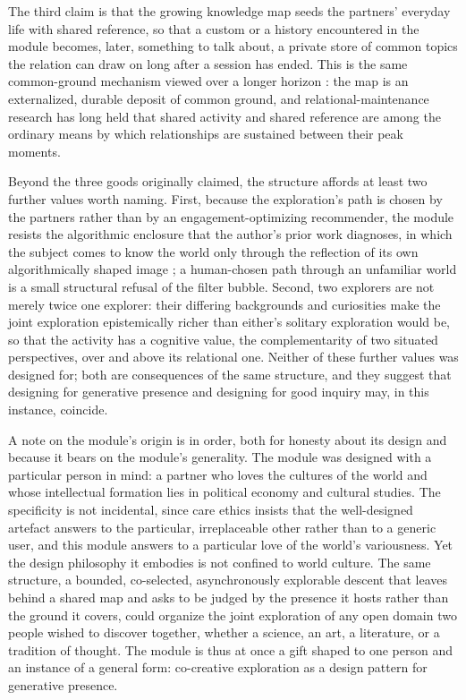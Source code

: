 \documentclass[11pt,a4paper]{article}
\begin{document}
The third claim is that the growing knowledge map seeds the partners' everyday life with shared reference, so that a custom or a history encountered in the module becomes, later, something to talk about, a private store of common topics the relation can draw on long after a session has ended. This is the same common-ground mechanism viewed over a longer horizon \parencite{clark1996using}: the map is an externalized, durable deposit of common ground, and relational-maintenance research has long held that shared activity and shared reference are among the ordinary means by which relationships are sustained between their peak moments.

Beyond the three goods originally claimed, the structure affords at least two further values worth naming. First, because the exploration's path is chosen by the partners rather than by an engagement-optimizing recommender, the module resists the algorithmic enclosure that the author's prior work diagnoses, in which the subject comes to know the world only through the reflection of its own algorithmically shaped image \parencite{huang2025relational}; a human-chosen path through an unfamiliar world is a small structural refusal of the filter bubble. Second, two explorers are not merely twice one explorer: their differing backgrounds and curiosities make the joint exploration epistemically richer than either's solitary exploration would be, so that the activity has a cognitive value, the complementarity of two situated perspectives, over and above its relational one. Neither of these further values was designed for; both are consequences of the same structure, and they suggest that designing for generative presence and designing for good inquiry may, in this instance, coincide.

A note on the module's origin is in order, both for honesty about its design and because it bears on the module's generality. The module was designed with a particular person in mind: a partner who loves the cultures of the world and whose intellectual formation lies in political economy and cultural studies. The specificity is not incidental, since care ethics insists that the well-designed artefact answers to the particular, irreplaceable other rather than to a generic user, and this module answers to a particular love of the world's variousness. Yet the design philosophy it embodies is not confined to world culture. The same structure, a bounded, co-selected, asynchronously explorable descent that leaves behind a shared map and asks to be judged by the presence it hosts rather than the ground it covers, could organize the joint exploration of any open domain two people wished to discover together, whether a science, an art, a literature, or a tradition of thought. The module is thus at once a gift shaped to one person and an instance of a general form: co-creative exploration as a design pattern for generative presence.
\end{document}
